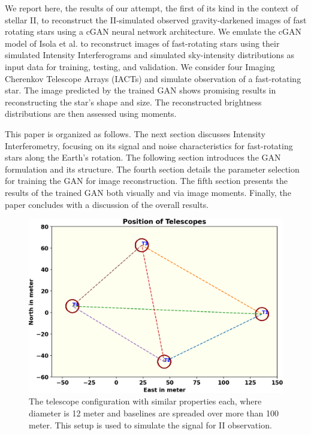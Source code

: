 We report here, the results of our attempt, the first of its kind in the context of stellar II, to reconstruct the II-simulated observed gravity-darkened images of fast rotating stars using a cGAN neural network architecture. We emulate the cGAN model of Isola et al. \cite{isola2017image} to reconstruct images of fast-rotating stars using their simulated Intensity Interferograms and simulated sky-intensity distributions as input data for training, testing, and validation. We consider four Imaging Cherenkov Telescope Arrays (IACTs) and simulate observation of a fast-rotating star. The image predicted by the trained GAN shows promising results in reconstructing the star’s shape and size. The reconstructed brightness distributions are then assessed using moments.

This paper is organized as follows. The next section discusses Intensity Interferometry, focusing on its signal and noise characteristics for fast-rotating stars along the Earth’s rotation. The following section introduces the GAN formulation and its structure. The fourth section details the parameter selection for training the GAN for image reconstruction. The fifth section presents the results of the trained GAN both visually and via image moments. Finally, the paper concludes with a discussion of the overall results.
\begin{figure}
	\centering
	\includegraphics[width=\linewidth]{fig/telescope.png}
	\caption{The telescope configuration with similar properties each, where diameter is 12 meter and baselines are spreaded over more than 100 meter. This setup is used to simulate the signal for II observation.}
	\label{fig:teles}
\end{figure}